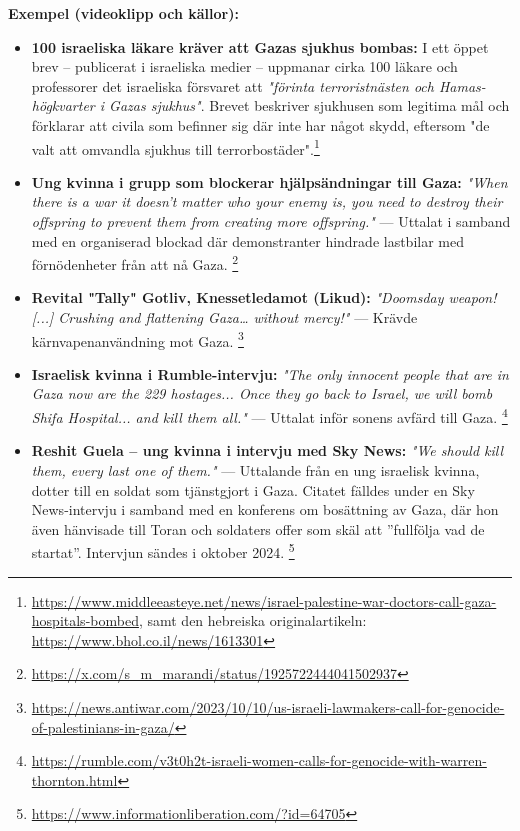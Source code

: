 \vspace{1em}
\textbf{Exempel (videoklipp och källor):}
\begin{itemize}
    \item \textbf{100 israeliska läkare kräver att Gazas sjukhus bombas:} I ett öppet brev – publicerat i israeliska medier – uppmanar cirka 100 läkare och professorer det israeliska försvaret att \textit{"förinta terroristnästen och Hamas-högkvarter i Gazas sjukhus"}. Brevet beskriver sjukhusen som legitima mål och förklarar att civila som befinner sig där inte har något skydd, eftersom "de valt att omvandla sjukhus till terrorbostäder".\footnote{\url{https://www.middleeasteye.net/news/israel-palestine-war-doctors-call-gaza-hospitals-bombed}, samt den hebreiska originalartikeln: \url{https://www.bhol.co.il/news/1613301}}

    \item \textbf{Ung kvinna i grupp som blockerar hjälpsändningar till Gaza:} \textit{"When there is a war it doesn't matter who your enemy is, you need to destroy their offspring to prevent them from creating more offspring."} — Uttalat i samband med en organiserad blockad där demonstranter hindrade lastbilar med förnödenheter från att nå Gaza. \footnote{\url{https://x.com/s_m_marandi/status/1925722444041502937}}

    \item \textbf{Revital "Tally" Gotliv, Knessetledamot (Likud):} \textit{"Doomsday weapon! [...] Crushing and flattening Gaza… without mercy!"} — Krävde kärnvapenanvändning mot Gaza. \footnote{\url{https://news.antiwar.com/2023/10/10/us-israeli-lawmakers-call-for-genocide-of-palestinians-in-gaza/}}

    \item \textbf{Israelisk kvinna i Rumble-intervju:} \textit{"The only innocent people that are in Gaza now are the 229 hostages... Once they go back to Israel, we will bomb Shifa Hospital... and kill them all."} — Uttalat inför sonens avfärd till Gaza. \footnote{\url{https://rumble.com/v3t0h2t-israeli-women-calls-for-genocide-with-warren-thornton.html}}

\item \textbf{Reshit Guela – ung kvinna i intervju med Sky News:} \textit{"We should kill them, every last one of them."} — Uttalande från en ung israelisk kvinna, dotter till en soldat som tjänstgjort i Gaza. Citatet fälldes under en Sky News-intervju i samband med en konferens om bosättning av Gaza, där hon även hänvisade till Toran och soldaters offer som skäl att ”fullfölja vad de startat”. Intervjun sändes i oktober 2024. \footnote{\url{https://www.informationliberation.com/?id=64705}}



\end{itemize}
